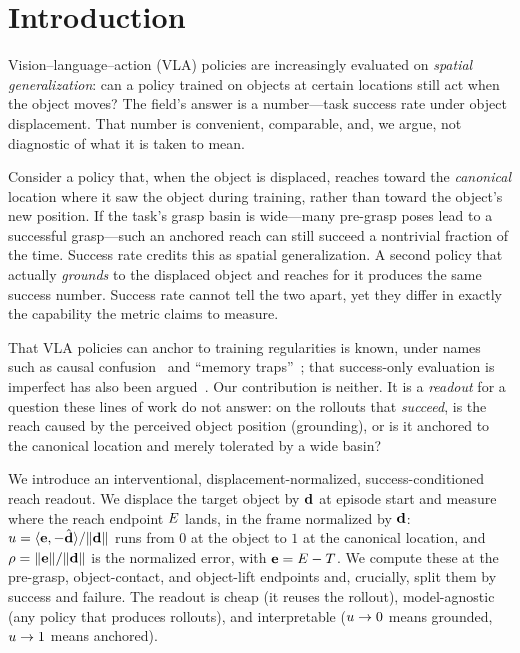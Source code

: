 \section{Introduction}
\label{sec:intro}

Vision--language--action (VLA) policies are increasingly evaluated on \emph{spatial
generalization}: can a policy trained on objects at certain locations still act when the
object moves? The field's answer is a number---task success rate under object
displacement. That number is convenient, comparable, and, we argue, not diagnostic of
what it is taken to mean.

Consider a policy that, when the object is displaced, reaches toward the \emph{canonical}
location where it saw the object during training, rather than toward the object's new
position. If the task's grasp basin is wide---many pre-grasp poses lead to a successful
grasp---such an anchored reach can still succeed a nontrivial fraction of the time.
Success rate credits this as spatial generalization. A second policy that actually
\emph{grounds} to the displaced object and reaches for it produces the same success
number. Success rate cannot tell the two apart, yet they differ in exactly the capability
the metric claims to measure.

That VLA policies can anchor to training regularities is known, under names such as
causal confusion~\citep{dehaan2019causal} and ``memory traps''~\citep{afi2025memory}; that
success-only evaluation is imperfect has also been argued~\citep{liberox2026}. Our
contribution is neither. It is a \emph{readout} for a question these lines of work do not
answer: on the rollouts that \emph{succeed}, is the reach caused by the perceived object
position (grounding), or is it anchored to the canonical location and merely tolerated by
a wide basin?

We introduce an interventional, displacement-normalized, success-conditioned reach
readout. We displace the target object by $\mathbf{d}$ at episode start and measure where the
reach endpoint $E$ lands, in the frame normalized by $\mathbf{d}$: $u = \langle \mathbf{e},
-\hat{\mathbf{d}}\rangle / \|\mathbf{d}\|$ runs from $0$ at the object to $1$ at the canonical
location, and $\rho = \|\mathbf{e}\|/\|\mathbf{d}\|$ is the normalized error, with $\mathbf{e} = E -
T$. We compute these at the pre-grasp, object-contact, and object-lift endpoints and,
crucially, split them by success and failure. The readout is cheap (it reuses the
rollout), model-agnostic (any policy that produces rollouts), and interpretable
($u \to 0$ means grounded, $u \to 1$ means anchored).

